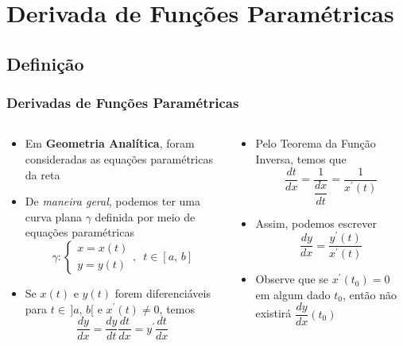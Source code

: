 \section{Derivada de Funções Paramétricas}
\subsection{Definição}
\begin{frame}
  \frametitle{Derivadas de Funções Paramétricas}
  \begin{columns}[onlytextwidth]
    \begin{column}{0.5\textwidth}\vspace{-0.5cm}
      \begin{itemize}
        \item Em \textbf{Geometria Analítica}, foram consideradas as equações paramétricas da reta
        \item De \emph{maneira geral}, podemos ter uma curva plana $\gamma$ definida por meio de equações paramétricas
        \begin{equation*}
          \gamma: \begin{cases}
            x = x(t) \\ y = y(t)
          \end{cases}\!\!\!\!\!\!\!,\,\,\,t\in [a,\,b]
        \end{equation*}
        \item Se $x(t)$ e $y(t)$ forem diferenciáveis para $t\in\, ]a,\,b[$ e $x^{\prime}(t)\not=0$, temos
        \begin{equation*}
          \frac{dy}{dx} = \frac{dy}{dt}\frac{dt}{dx} = y^{\prime}\frac{dt}{dx}
        \end{equation*}
      \end{itemize}
    \end{column}
    \begin{column}{0.5\textwidth}\vspace{-0.5cm}
      \begin{itemize}
        \item Pelo Teorema da Função Inversa, temos que
        \begin{equation*}
          \frac{dt}{dx} = \frac{1}{\dfrac{dx}{dt}} = \frac{1}{x^{\prime}(t)}
        \end{equation*}
        \item Assim, podemos escrever
        \begin{equation*}
          \frac{dy}{dx} = \frac{y^{\prime}(t)}{x^{\prime}(t)}
        \end{equation*}
        \item Observe que se $x^{\prime}(t_{0}) = 0$ em algum dado $t_{0}$, então não existirá $\dfrac{dy}{dx}(t_{0})$
      \end{itemize}
    \end{column}
  \end{columns}
\end{frame}

